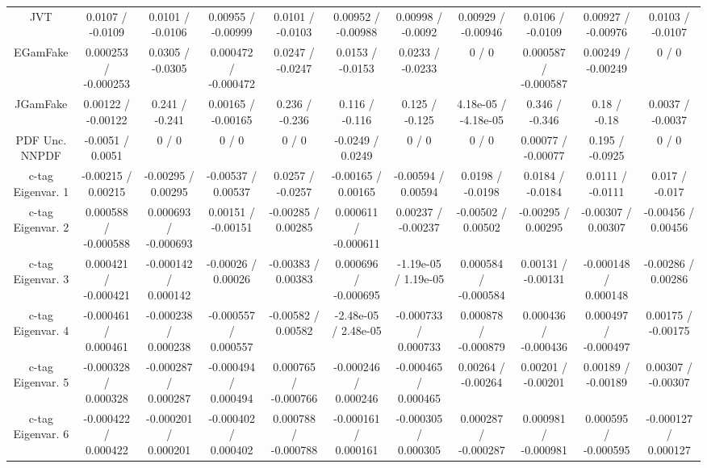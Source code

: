 \begin{table}[htbp]
\begin{center}
\begin{tabular}{|c|c|c|c|c|c|c|c|c|c|c|}
  JVT & 0.0107 / -0.0109 & 0.0101 / -0.0106 & 0.00955 / -0.00999 & 0.0101 / -0.0103 & 0.00952 / -0.00988 & 0.00998 / -0.0092 & 0.00929 / -0.00946 & 0.0106 / -0.0109 & 0.00927 / -0.00976 & 0.0103 / -0.0107 \\ 
  EGamFake & 0.000253 / -0.000253 & 0.0305 / -0.0305 & 0.000472 / -0.000472 & 0.0247 / -0.0247 & 0.0153 / -0.0153 & 0.0233 / -0.0233 & 0 / 0 & 0.000587 / -0.000587 & 0.00249 / -0.00249 & 0 / 0 \\ 
  JGamFake & 0.00122 / -0.00122 & 0.241 / -0.241 & 0.00165 / -0.00165 & 0.236 / -0.236 & 0.116 / -0.116 & 0.125 / -0.125 & 4.18e-05 / -4.18e-05 & 0.346 / -0.346 & 0.18 / -0.18 & 0.0037 / -0.0037 \\ 
  PDF Unc. NNPDF & -0.0051 / 0.0051 & 0 / 0 & 0 / 0 & 0 / 0 & -0.0249 / 0.0249 & 0 / 0 & 0 / 0 & 0.00077 / -0.00077 & 0.195 / -0.0925 & 0 / 0 \\ 
  c-tag Eigenvar. 1 & -0.00215 / 0.00215 & -0.00295 / 0.00295 & -0.00537 / 0.00537 & 0.0257 / -0.0257 & -0.00165 / 0.00165 & -0.00594 / 0.00594 & 0.0198 / -0.0198 & 0.0184 / -0.0184 & 0.0111 / -0.0111 & 0.017 / -0.017 \\ 
  c-tag Eigenvar. 2 & 0.000588 / -0.000588 & 0.000693 / -0.000693 & 0.00151 / -0.00151 & -0.00285 / 0.00285 & 0.000611 / -0.000611 & 0.00237 / -0.00237 & -0.00502 / 0.00502 & -0.00295 / 0.00295 & -0.00307 / 0.00307 & -0.00456 / 0.00456 \\ 
  c-tag Eigenvar. 3 & 0.000421 / -0.000421 & -0.000142 / 0.000142 & -0.00026 / 0.00026 & -0.00383 / 0.00383 & 0.000696 / -0.000695 & -1.19e-05 / 1.19e-05 & 0.000584 / -0.000584 & 0.00131 / -0.00131 & -0.000148 / 0.000148 & -0.00286 / 0.00286 \\ 
  c-tag Eigenvar. 4 & -0.000461 / 0.000461 & -0.000238 / 0.000238 & -0.000557 / 0.000557 & -0.00582 / 0.00582 & -2.48e-05 / 2.48e-05 & -0.000733 / 0.000733 & 0.000878 / -0.000879 & 0.000436 / -0.000436 & 0.000497 / -0.000497 & 0.00175 / -0.00175 \\ 
  c-tag Eigenvar. 5 & -0.000328 / 0.000328 & -0.000287 / 0.000287 & -0.000494 / 0.000494 & 0.000765 / -0.000766 & -0.000246 / 0.000246 & -0.000465 / 0.000465 & 0.00264 / -0.00264 & 0.00201 / -0.00201 & 0.00189 / -0.00189 & 0.00307 / -0.00307 \\ 
  c-tag Eigenvar. 6 & -0.000422 / 0.000422 & -0.000201 / 0.000201 & -0.000402 / 0.000402 & 0.000788 / -0.000788 & -0.000161 / 0.000161 & -0.000305 / 0.000305 & 0.000287 / -0.000287 & 0.000981 / -0.000981 & 0.000595 / -0.000595 & -0.000127 / 0.000127 \\ 

\end{tabular}
\end{center}
\end{table}
